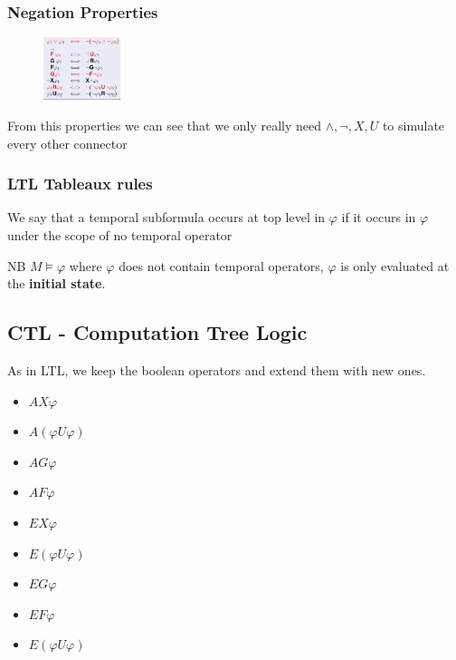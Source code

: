 \documentclass{article}
\begin{document}
\subsubsection{Negation Properties}
\begin{figure}
    \includegraphics[width=0.2\textwidth]{images/LTLneg.png}
\end{figure}
From this properties we can see that we only really need $\wedge,\neg,X,U$ to simulate every other connector

\subsubsection{LTL Tableaux rules}
We say that a temporal subformula occurs at top level in $\varphi$ if it occurs in $\varphi$ under the scope of no temporal operator

\begin{callout}[red]{NB}
    $M\models\varphi$ where $\varphi$ does not contain temporal operators, $\varphi$ is only evaluated at the \textbf{initial state}.
\end{callout}

\subsection{CTL - Computation Tree Logic}
As in LTL, we keep the boolean operators and extend them with new ones.
\begin{itemize}
    \item $AX\varphi$
    \item $A(\varphi U \varphi)$
    \item $AG\varphi$
    \item $AF\varphi$
    \item $EX\varphi$
    \item $E(\varphi U \varphi)$
    \item $EG\varphi$
    \item $EF\varphi$
    \item $E(\varphi U \varphi)$
\end{itemize}
\end{document}
